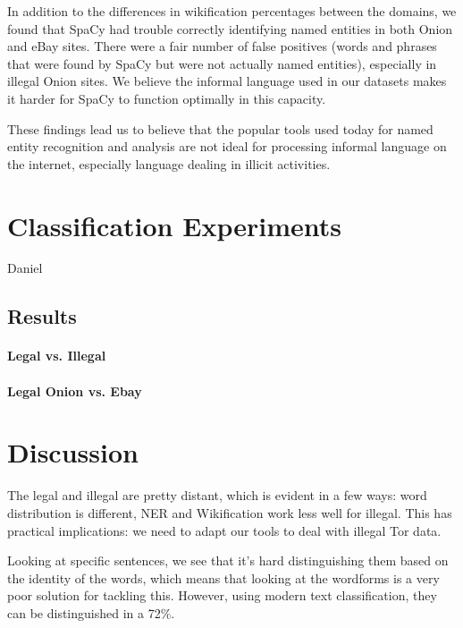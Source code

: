 \documentclass[11pt,a4paper]{article}
\begin{document}
In addition to the differences in wikification percentages between
the domains, we found that SpaCy had trouble correctly identifying
named entities in both Onion and eBay sites. There were a fair number
of false positives (words and phrases that were found by SpaCy but
were not actually named entities), especially in illegal Onion sites.
We believe the informal language used in our datasets makes it harder
for SpaCy to function optimally in this capacity.

These findings lead us to believe that the popular tools used today
for named entity recognition and analysis are not ideal for processing
informal language on the internet, especially language dealing in
illicit activities. 

\section{Classification Experiments}

Daniel

\subsection{Results}

\paragraph{Legal vs. Illegal}

\paragraph{Legal Onion vs. Ebay}


\section{Discussion}

The legal and illegal are pretty distant, which is evident in a few ways: word distribution is different, NER and Wikification work less well
for illegal. This has practical implications: we need to adapt our tools to deal with illegal Tor data. 

Looking at specific sentences, we see that it's hard distinguishing them based on the identity of the words, which means that
looking at the wordforms is a very poor solution for tackling this. However, using modern text classification, they can be distinguished
in a 72\%. 
\end{document}

